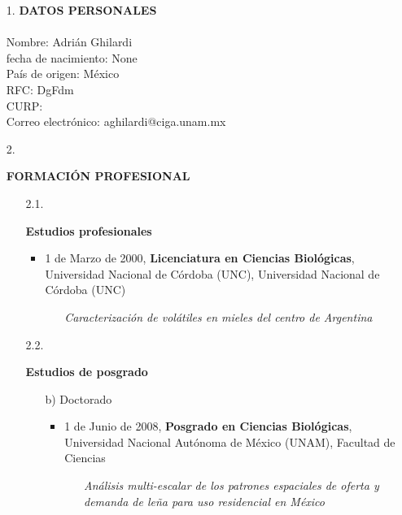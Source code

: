 \documentclass[12pt]{report}
\begin{document}
    \begin{enumerate}

        \item[1.]{ \textbf{DATOS PERSONALES} \\ \\
            Nombre: Adrián Ghilardi \\
            fecha de nacimiento: None \\
            País de origen: México \\
            RFC: DgFdm \\
            CURP:  \\
            Correo electrónico: aghilardi@ciga.unam.mx \\
            }

        \item[2.]{ \textbf{ FORMACIÓN PROFESIONAL }
            \begin{enumerate}


                \item[2.1.]{ \textbf{Estudios profesionales}
                      \begin{itemize}

                              \item 1 de Marzo de 2000,\textbf{ Licenciatura en Ciencias Biológicas}, Universidad Nacional de Córdoba (UNC), Universidad Nacional de Córdoba (UNC)
                                  \begin{itemize}
                                      \item[]{\textit{ Caracterización de volátiles en mieles del centro de Argentina }}
                                  \end{itemize}

                      \end{itemize}
                      }



                \item[2.2.]{ \textbf{Estudios de posgrado}
                          \begin{itemize}[label=\FilledSmallSquare]




                              \item[b)] Doctorado
                                  \begin{itemize}

                                          \item 1 de Junio de 2008,\textbf{ Posgrado en Ciencias Biológicas}, Universidad Nacional Autónoma de México (UNAM), Facultad de Ciencias
                                              \begin{itemize}
                                                  \item[]{\textit{ Análisis multi-escalar de los patrones espaciales de oferta y demanda de leña para uso residencial en México }}
                                              \end{itemize}


\end{itemize}
\end{itemize}}
\end{enumerate}}
\end{enumerate}
\end{document}
